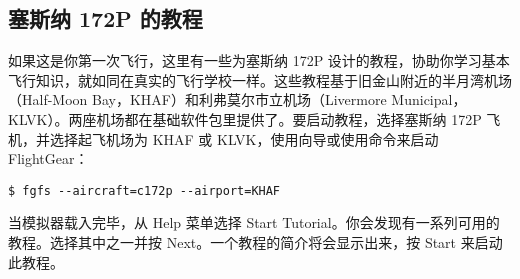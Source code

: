 \ifchinese
\subsection{塞斯纳 172P 的教程}

如果这是你第一次飞行，这里有一些为塞斯纳 172P 设计的教程，协助你学习基本飞行知识，就如同在真实的飞行学校一样。这些教程基于旧金山附近的半月湾机场（Half-Moon Bay，KHAF）和利弗莫尔市立机场（Livermore Municipal，KLVK）。两座机场都在基础软件包里提供了。要启动教程，选择塞斯纳 172P 飞机，并选择起飞机场为 KHAF 或 KLVK，使用向导或使用命令来启动 FlightGear：
\fi
\iffalse
\IfLanguageName{english}{
\subsection{Cessna 172P tutorials}

If this is your first time flying, a number of tutorials exist for the
Cessna 172P designed to teach you the basics of flight, in a similar way to a
real flight school. The tutorials are based around Half-Moon Bay (KHAF) and
Livermore Municipal (KLVK) airports near San Francisco. Both these airports are
provided in the base package. To start the tutorials, select the Cessna 172P
aircraft, and a starting airport of KHAF or KLVK, using the wizard, or the
command line:
}{}
\fi


\begin{verbatim}
$ fgfs --aircraft=c172p --airport=KHAF
\end{verbatim}

\ifchinese
当模拟器载入完毕，从 Help 菜单选择 Start Tutorial。你会发现有一系列可用的教程。选择其中之一并按 Next。一个教程的简介将会显示出来，按 Start 来启动此教程。
\fi
\iffalse
\IfLanguageName{english}{
When the simulator has loaded, select Start Tutorial from the Help menu. You
will then be presented with a list of the tutorials available. Select a tutorial
and press Next. A description of the tutorial is displayed. Press Start
 to start the tutorial.
}{}
\fi

